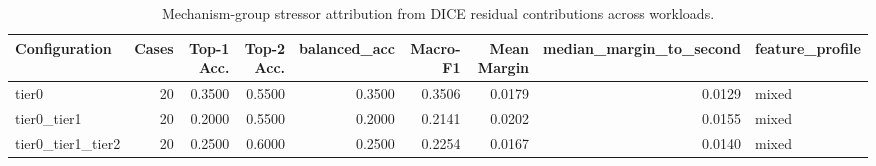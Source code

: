 \begin{table}[t]
\centering
\caption{Mechanism-group stressor attribution from DICE residual contributions across workloads.}
\label{tab:dice_stressor_diagnosis}
\footnotesize
\begin{tabular}{lrrrrrrrl}
\toprule
Configuration & Cases & Top-1 Acc. & Top-2 Acc. & balanced_acc & Macro-F1 & Mean Margin & median_margin_to_second & feature_profile \\
\midrule
tier0 & 20 & 0.3500 & 0.5500 & 0.3500 & 0.3506 & 0.0179 & 0.0129 & mixed \\
tier0_tier1 & 20 & 0.2000 & 0.5500 & 0.2000 & 0.2141 & 0.0202 & 0.0155 & mixed \\
tier0_tier1_tier2 & 20 & 0.2500 & 0.6000 & 0.2500 & 0.2254 & 0.0167 & 0.0140 & mixed \\
\bottomrule
\end{tabular}

\end{table}

